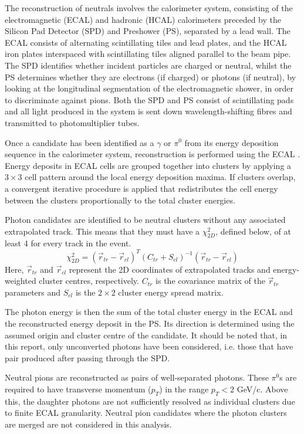 \documentclass[oneside,12pt]{article}
\begin{document}
The reconstruction of neutrals involves the calorimeter system, consisting of
the electromagnetic (ECAL) and hadronic (HCAL) calorimeters preceded by the
Silicon Pad Detector (SPD) and Preshower (PS), separated by a lead wall. The
ECAL consists of alternating scintillating tiles and lead plates, and the HCAL
iron plates interspaced with scintillating tiles aligned parallel to the beam
pipe. The SPD identifies whether incident particles are charged or neutral,
whilst the PS determines whether they are electrons (if charged) or photons (if
neutral), by looking at the longitudinal segmentation of the electromagnetic
shower, in order to discriminate against pions. Both the SPD and PS consist of
scintillating pads and all light produced in the system is sent down
wavelength-shifting fibres and transmitted to photomultiplier tubes.

Once a candidate has been identified as a $\gamma$ or $\pi^0$ from its energy
deposition sequence in the calorimeter system, reconstruction is performed using
the ECAL \cite{NeutralReconstruction}. Energy deposits in ECAL cells are grouped
together into clusters by applying a $3\times3$ cell pattern around the local
energy deposition maxima. If clusters overlap, a convergent iterative procedure
is applied that redistributes the cell energy between the clusters
proportionally to the total cluster energies.

Photon candidates are identified to be neutral clusters without any associated
extrapolated track. This means that they must have a $\chi^2_{2D}$, defined
below, of at least 4 for every track in the event.
\begin{equation}
  \chi^2_{2D}=(\vec{r}_{tr}-\vec{r}_{cl})^T(C_{tr}+S_{cl})^{-1}(\vec{r}_{tr}-\vec{r}_{cl})
  \label{Chi2}
\end{equation}
\noindent Here, $\vec{r}_{tr}$ and $\vec{r}_{cl}$ represent the 2D coordinates
of extrapolated tracks and energy-weighted cluster centres, respectively.
$C_{tr}$ is the covariance matrix of the $\vec{r}_{tr}$ parameters and $S_{cl}$
is the $2 \times 2$ cluster energy spread matrix.  

The photon energy is then the sum of the total cluster energy in the ECAL and
the reconstructed energy deposit in the PS. Its direction is determined using
the assumed origin and cluster centre of the candidate. It should be noted that,
in this report, only unconverted photons have been considered, i.e. those that
have pair produced after passing through the SPD.

Neutral pions are reconstructed as pairs of well-separated photons. These
$\pi^0$s are required to have transverse momentum ($p_T$) in the range $p_{T}<2$
GeV/c.  Above this, the daughter photons are not sufficiently resolved as
individual clusters due to finite ECAL granularity. Neutral pion candidates
where the photon clusters are merged are not considered in this analysis.
\end{document}
